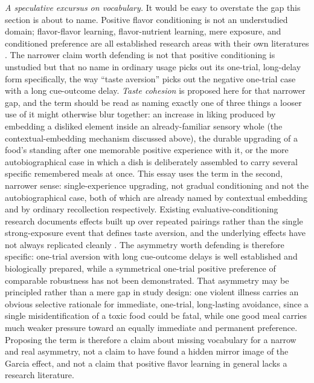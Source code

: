 \documentclass[11pt]{article}
\begin{document}
\emph{A speculative excursus on vocabulary.} It would be easy to overstate the gap this section is about to name. Positive flavor conditioning is not an understudied domain; flavor-flavor learning, flavor-nutrient learning, mere exposure, and conditioned preference are all established research areas with their own literatures \citep{zellner1983conditioned,rozin1985pavlovian}. The narrower claim worth defending is not that positive conditioning is unstudied but that no name in ordinary usage picks out its one-trial, long-delay form specifically, the way ``taste aversion'' picks out the negative one-trial case with a long cue-outcome delay. \emph{Taste cohesion} is proposed here for that narrower gap, and the term should be read as naming exactly one of three things a looser use of it might otherwise blur together: an increase in liking produced by embedding a disliked element inside an already-familiar sensory whole (the contextual-embedding mechanism discussed above), the durable upgrading of a food's standing after one memorable positive experience with it, or the more autobiographical case in which a dish is deliberately assembled to carry several specific remembered meals at once. This essay uses the term in the second, narrower sense: single-experience upgrading, not gradual conditioning and not the autobiographical case, both of which are already named by contextual embedding and by ordinary recollection respectively. Existing evaluative-conditioning research documents effects built up over repeated pairings rather than the single strong-exposure event that defines taste aversion, and the underlying effects have not always replicated cleanly \citep{zellner1983conditioned,rozin1985pavlovian}. The asymmetry worth defending is therefore specific: one-trial aversion with long cue-outcome delays is well established and biologically prepared, while a symmetrical one-trial positive preference of comparable robustness has not been demonstrated. That asymmetry may be principled rather than a mere gap in study design: one violent illness carries an obvious selective rationale for immediate, one-trial, long-lasting avoidance, since a single misidentification of a toxic food could be fatal, while one good meal carries much weaker pressure toward an equally immediate and permanent preference. Proposing the term is therefore a claim about missing vocabulary for a narrow and real asymmetry, not a claim to have found a hidden mirror image of the Garcia effect, and not a claim that positive flavor learning in general lacks a research literature.
\end{document}
